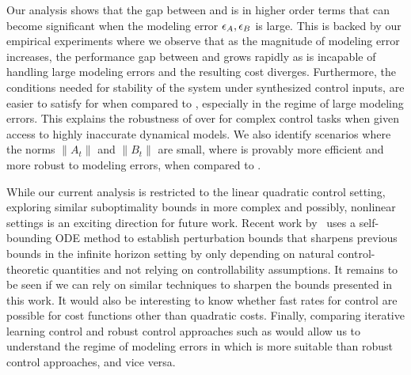 Our analysis shows that the gap between \ILC{} and \MM{} is in higher
order terms that can become
significant when the modeling error $\epsilon_A, \epsilon_B$ is large. This is
backed by our empirical experiments where we observe that as the
magnitude of modeling error increases, the performance gap between \ILC{}
and \MM{} grows rapidly as \MM{} is incapable of handling large modeling
errors and the resulting cost diverges. Furthermore, the conditions
needed for stability of the system under synthesized control inputs,
are easier to satisfy for \ILC{} when compared to \MM{}, especially in the
regime of large modeling errors. This explains the robustness of \ILC{}
over \MM{} for complex control tasks when given access to highly
inaccurate dynamical models. We also identify scenarios where the
norms $\|A_t\|$ and $\|B_t\|$ are small, where \ILC{} is
provably more efficient and more robust to modeling errors, when
compared to \MM{}.

While our current analysis is restricted to the linear quadratic
control setting, exploring similar suboptimality bounds in more
complex and possibly, nonlinear settings is an exciting direction for
future work. Recent work by~\cite{DBLP:conf/icml/SimchowitzF20} uses a
self-bounding ODE method to establish perturbation bounds that
sharpens previous bounds in the infinite horizon setting by only depending on natural
control-theoretic quantities and not relying on controllability
assumptions. It remains to be seen if we can rely on similar
techniques to sharpen the bounds presented in this work.
It would also be interesting to know whether fast rates for
control are possible for cost functions other than quadratic
costs. Finally, comparing iterative learning control and robust
control approaches such as \cite{DBLP:journals/focm/DeanMMRT20} would allow us to understand
the regime of modeling errors in which \ILC{} is more suitable than
robust control approaches, and vice versa.

